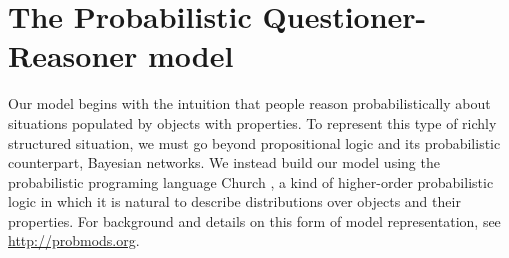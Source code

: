 \documentclass[10pt,letterpaper]{article}
\begin{document}
%
%

\section{The Probabilistic Questioner-Reasoner model}

Our model begins with the intuition that people reason probabilistically about situations populated by objects with properties. To represent this type of richly structured situation, we must go beyond propositional logic and its probabilistic counterpart, Bayesian networks. We instead build our model using the probabilistic programing language Church \cite{Goodman2008}, a kind of higher-order probabilistic logic in which it is natural to describe distributions over objects and their properties. For background and details on this form of model representation, see \url{http://probmods.org}.
\end{document}
